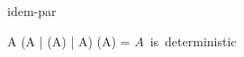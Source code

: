 \begin{circuslaw}{idem-par}
\begin{circusaction*}
  A \; \equiv \; (A \lpar \emptyset | \usedC(A) | \emptyset \rpar A) \; \provided \; \wrt(A) = \emptyset \; \provand \; \mbox{$A$ is deterministic}
\end{circusaction*}
\end{circuslaw}

